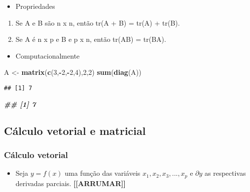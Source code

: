 \documentclass[
]{article}
\newenvironment{Shaded}{\begin{snugshade}}{\end{snugshade}}
\newcommand{\DecValTok}[1]{\textcolor[rgb]{0.00,0.00,0.81}{#1}}
\newcommand{\DocumentationTok}[1]{\textcolor[rgb]{0.56,0.35,0.01}{\textbf{\textit{#1}}}}
\newcommand{\FunctionTok}[1]{\textcolor[rgb]{0.13,0.29,0.53}{\textbf{#1}}}
\newcommand{\NormalTok}[1]{#1}
\newcommand{\OtherTok}[1]{\textcolor[rgb]{0.56,0.35,0.01}{#1}}
\newcommand{\SpecialCharTok}[1]{\textcolor[rgb]{0.81,0.36,0.00}{\textbf{#1}}}
\providecommand{\tightlist}{%
  \setlength{\itemsep}{0pt}\setlength{\parskip}{0pt}}
\begin{document}
\begin{itemize}
\tightlist
\item
  Propriedades
\end{itemize}

\begin{enumerate}
\def\labelenumi{\arabic{enumi}.}
\tightlist
\item
  Se A e B são n x n, então tr(A + B) = tr(A) + tr(B).
\item
  Se A é n x p e B e p x n, então tr(AB) = tr(BA).
\end{enumerate}

\begin{itemize}
\tightlist
\item
  Computacionalmente
\end{itemize}

\begin{Shaded}
\begin{Highlighting}[]
\NormalTok{A }\OtherTok{\textless{}{-}} \FunctionTok{matrix}\NormalTok{(}\FunctionTok{c}\NormalTok{(}\DecValTok{3}\NormalTok{,}\SpecialCharTok{{-}}\DecValTok{2}\NormalTok{,}\SpecialCharTok{{-}}\DecValTok{2}\NormalTok{,}\DecValTok{4}\NormalTok{),}\DecValTok{2}\NormalTok{,}\DecValTok{2}\NormalTok{)}
\FunctionTok{sum}\NormalTok{(}\FunctionTok{diag}\NormalTok{(A))}
\end{Highlighting}
\end{Shaded}

\begin{verbatim}
## [1] 7
\end{verbatim}

\begin{Shaded}
\begin{Highlighting}[]
\DocumentationTok{\#\# [1] 7}
\end{Highlighting}
\end{Shaded}

\hypertarget{cuxe1lculo-vetorial-e-matricial}{%
\subsection{Cálculo vetorial e
matricial}\label{cuxe1lculo-vetorial-e-matricial}}

\hypertarget{cuxe1lculo-vetorial}{%
\subsubsection{Cálculo vetorial}\label{cuxe1lculo-vetorial}}

\begin{itemize}
\tightlist
\item
  Seja \(y = f(x)\) uma função das variáveis
  \(x_{1}, x_{2}, x_{3}, ... , x_{p}\) e \(\partial y\) as respectivas
  derivadas parciais. \textbf{{[}{[}ARRUMAR{]}{]}}
\end{itemize}
\end{document}
